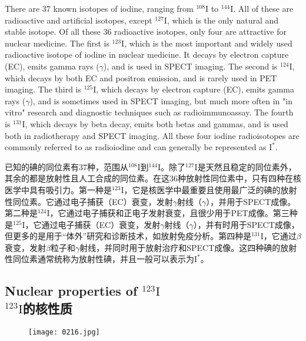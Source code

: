 \documentclass[dvipsnames, svgnames,a4paper,11pt]{article}
\begin{document}
There are 37 known isotopes of iodine, ranging from \(\mathrm{^{108}I}\) to \(\mathrm{^{144}I}\). All of these are radioactive and artificial isotopes, except \(\mathrm{^{127}I}\), which is the only natural and stable isotope. Of all these 36 radioactive isotopes, only four are attractive for nuclear medicine.  The first is \(\mathrm{^{123}I}\), which is the most important and widely used radioactive isotope of iodine in nuclear medicine. It decays by electron capture (EC), emits gamma rays (\(\gamma\)), and is used in SPECT imaging. The second is \(\mathrm{^{124}I}\), which decays by both EC and positron emission, and is rarely used in PET imaging. The third is \(\mathrm{^{125}I}\), which decays by electron capture (EC), emits gamma rays (\(\gamma\)), and is sometimes used in SPECT imaging, but much more often in "in vitro" research and diagnostic techniques such as radioimmunoassay. The fourth is \(\mathrm{^{131}I}\), which decays by beta decay, emits both betas and gammas, and is used both in radiotherapy and SPECT imaging.  All these four iodine radioisotopes are commonly referred to as radioiodine and can generally be represented as \(\mathrm{I^*}\).


已知的碘的同位素有37种，范围从\(\mathrm{^{108}I}\)到\(\mathrm{^{144}I}\)。除了\(\mathrm{^{127}I}\)是天然且稳定的同位素外，其余的都是放射性且人工合成的同位素。在这36种放射性同位素中，只有四种在核医学中具有吸引力。第一种是\(\mathrm{^{123}I}\)，它是核医学中最重要且使用最广泛的碘的放射性同位素。它通过电子捕获（EC）衰变，发射$\gamma$射线（\(\gamma\)），并用于SPECT成像。第二种是\(\mathrm{^{124}I}\)，它通过电子捕获和正电子发射衰变，且很少用于PET成像。第三种是\(\mathrm{^{125}I}\)，它通过电子捕获（EC）衰变，发射$\gamma$射线（\(\gamma\)），并有时用于SPECT成像，但更多的是用于“体外”研究和诊断技术，如放射免疫分析。第四种是\(\mathrm{^{131}I}\)，它通过$\beta$衰变，发射$\beta$粒子和$\gamma$射线，并同时用于放射治疗和SPECT成像。这四种碘的放射性同位素通常统称为放射性碘，并且一般可以表示为\(\mathrm{I^*}\)。

\subsection{Nuclear properties of \(\mathrm{^{123}I}\)\\ \(\mathrm{^{123}I}\)的核性质}  

\begin{figure}[h]
	\centering
    \texttt{[image: 0216.jpg]}  
     \label{fig270}
\end{figure}
\end{document}
